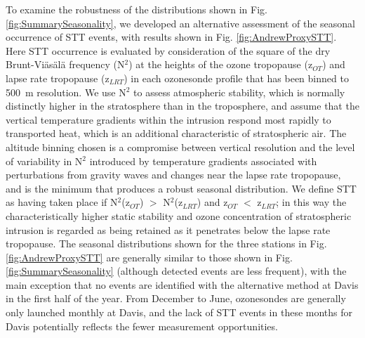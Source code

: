   
  To examine the robustness of the distributions shown in Fig. \ref{fig:SummarySeasonality}, we developed an alternative assessment of the seasonal occurrence of STT events, with results shown in Fig. \ref{fig:AndrewProxySTT}.
  Here STT occurrence is evaluated by consideration of the square of the dry Brunt-Viäsälä frequency (N$^2$) at the heights of the ozone tropopause (z$_{OT}$) and lapse rate tropopause (z$_{LRT}$) in each ozonesonde profile that has been binned to 500~m resolution.
  We use N$^2$ to assess atmospheric stability, which is normally distinctly higher in the stratosphere than in the troposphere, and assume that the vertical temperature gradients within the intrusion respond most rapidly to transported heat, which is an additional characteristic of stratospheric air.
  The altitude binning chosen is a compromise between vertical resolution and the level of variability in N$^2$ introduced by temperature gradients associated with perturbations from gravity waves and changes near the lapse rate tropopause, and is the minimum that produces a robust seasonal distribution.
  We define STT as having taken place if N$^2$(z$_{OT}$) $>$ N$^2$(z$_{LRT}$) and z$_{OT}$ $<$ z$_{LRT}$; in this way the characteristically higher static stability and ozone concentration of stratospheric intrusion is regarded as being retained as it penetrates below the lapse rate tropopause. 
  The seasonal distributions shown for the three stations in Fig. \ref{fig:AndrewProxySTT} are generally similar to those shown in Fig. \ref{fig:SummarySeasonality} (although detected events are less frequent), with the main exception that no events are identified with the alternative method at Davis in the first half of the year.
  From December to June, ozonesondes are generally only launched monthly at Davis, and the lack of STT events in these months for Davis potentially reflects the fewer measurement opportunities.
  
